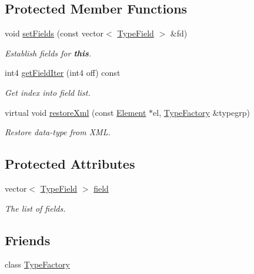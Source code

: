 \subsection*{Protected Member Functions}
\begin{DoxyCompactItemize}
\item 
void \mbox{\hyperlink{class_type_struct_abf9d27b301d027a5fad874b1f8c93b8c}{set\+Fields}} (const vector$<$ \mbox{\hyperlink{struct_type_field}{Type\+Field}} $>$ \&fd)
\begin{DoxyCompactList}\small\item\em Establish fields for {\bfseries{this}}. \end{DoxyCompactList}\item 
int4 \mbox{\hyperlink{class_type_struct_a82d2668e499477ae063f30d8f1b9daab}{get\+Field\+Iter}} (int4 off) const
\begin{DoxyCompactList}\small\item\em Get index into field list. \end{DoxyCompactList}\item 
virtual void \mbox{\hyperlink{class_type_struct_af2b09832da8420f6da67382a4e2d9f0e}{restore\+Xml}} (const \mbox{\hyperlink{class_element}{Element}} $\ast$el, \mbox{\hyperlink{class_type_factory}{Type\+Factory}} \&typegrp)
\begin{DoxyCompactList}\small\item\em Restore data-\/type from X\+ML. \end{DoxyCompactList}\end{DoxyCompactItemize}
\subsection*{Protected Attributes}
\begin{DoxyCompactItemize}
\item 
vector$<$ \mbox{\hyperlink{struct_type_field}{Type\+Field}} $>$ \mbox{\hyperlink{class_type_struct_a4d5a49b12324fb588f6c1631c35bc37d}{field}}
\begin{DoxyCompactList}\small\item\em The list of fields. \end{DoxyCompactList}\end{DoxyCompactItemize}
\subsection*{Friends}
\begin{DoxyCompactItemize}
\item 
class \mbox{\hyperlink{class_type_struct_ac8c1945d0a63785e78b3e09a13226ed6}{Type\+Factory}}
\end{DoxyCompactItemize}

